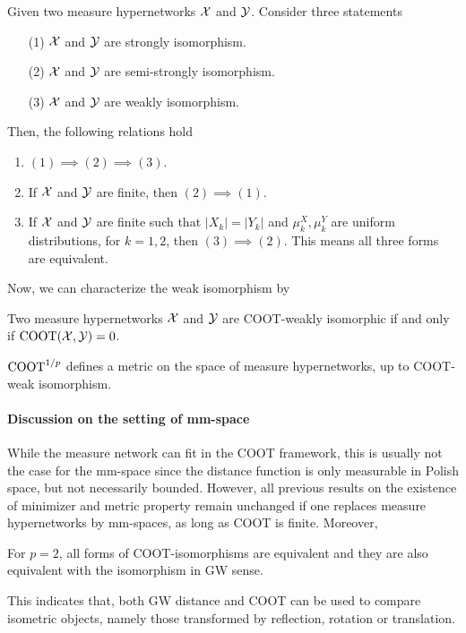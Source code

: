 \begin{corollary} \label{prop:strong_weak_iso}
  Given two measure hypernetworks $\mathcal X$ and $\mathcal Y$. Consider three statements
  \begin{enumerate}
    \item[(1)] $\mathcal X$ and $\mathcal Y$ are strongly isomorphism.
    \item[(2)] $\mathcal X$ and $\mathcal Y$ are semi-strongly isomorphism.
    \item[(3)] $\mathcal X$ and $\mathcal Y$ are weakly isomorphism.
  \end{enumerate}
  Then, the following relations hold
  \begin{enumerate}
    \item $(1) \implies (2) \implies (3)$.
    \item If $\mathcal X$ and $\mathcal Y$ are finite, then $(2) \implies (1)$.
    \item If $\mathcal X$ and $\mathcal Y$ are finite such that $|X_k| = |Y_k|$
    and $\mu_k^X, \mu_k^Y$ are uniform distributions, for $k = 1,2$, then
    $(3) \implies (2)$. This means all three forms are equivalent.
  \end{enumerate}
\end{corollary}
Now, we can characterize the weak isomorphism by
\begin{proposition} \label{prop:coot_iso}
  Two measure hypernetworks $\mathcal X$ and $\mathcal Y$ are COOT-weakly isomorphic if and only if
  $\text{COOT}(\mathcal X, \mathcal Y) = 0$.
\end{proposition}
\begin{proposition} \label{prop:metric_prop}
  $\text{COOT}^{1/p}$ defines a metric on the space of measure hypernetworks, up to COOT-weak isomorphism.
\end{proposition}
\paragraph{Discussion on the setting of mm-space}
While the measure network can fit in the COOT framework, this is usually not the case for
the mm-space since the distance function is only measurable in Polish space,
but not necessarily bounded. However, all previous results on the existence of minimizer and
metric property remain unchanged if one replaces measure hypernetworks by mm-spaces,
as long as COOT is finite. Moreover,
\begin{corollary}
For $p=2$, all forms of COOT-isomorphisms are equivalent and
they are also equivalent with the isomorphism in GW sense.
\end{corollary}
This indicates that, both GW distance and COOT can be used to compare isometric objects,
namely those transformed by reflection, rotation or translation.

